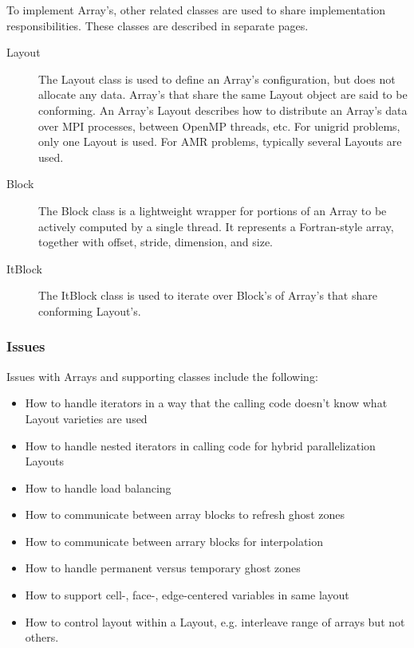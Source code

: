 To implement Array's, other related classes are used to share implementation responsibilities. These classes are described in separate pages.

\begin{description}
\item [Layout] The Layout class is used to define an Array's
  configuration, but does not allocate any data. Array's that share
  the same Layout object are said to be conforming. An Array's Layout
  describes how to distribute an Array's data over MPI processes,
  between OpenMP threads, etc. For unigrid problems, only one Layout
  is used. For AMR problems, typically several Layouts are used.

\item [Block] The Block class is a lightweight wrapper for portions of
  an Array to be actively computed by a single thread. It represents a
  Fortran-style array, together with offset, stride, dimension, and
  size.

\item [ItBlock] The ItBlock class is used to iterate over Block's of
  Array's that share conforming Layout's.
\end{description}

\subsubsection{Issues}

Issues with Arrays and supporting classes include the following:

\begin{itemize}
\item How to handle iterators in a way that the calling code doesn't
  know what Layout varieties are used
\item How to handle nested iterators in calling code for hybrid
  parallelization Layouts
\item How to handle load balancing
\item How to communicate between array blocks to refresh ghost zones
\item How to communicate between arrary blocks for interpolation
\item How to handle permanent versus temporary ghost zones
\item How to support cell-, face-, edge-centered variables in same
  layout
\item How to control layout within a Layout, e.g. interleave range of
  arrays but not others.
\end{itemize}

